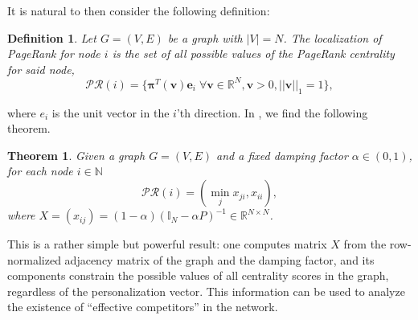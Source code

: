 \documentclass[sn-mathphys-ay]{sn-jnl}%
\newcommand{\R}{\mathbb{R}}
\newcommand{\N}{\mathbb{N}}
\newcommand{\I}{\mathbb{I}}
\theoremstyle{thmstyleone}%
\newtheorem{theorem}{Theorem}%
\theoremstyle{thmstyletwo}%
\theoremstyle{thmstylethree}%
\newtheorem{definition}{Definition}%
\begin{document}
It is natural to then consider the following definition:
\begin{definition}\label{def:localizationPageRank}
	Let $G=(V,E)$ be a graph with $|V|=N$. The localization of PageRank for node $i$ is the set of all possible values of the PageRank centrality for said node,
	\begin{equation}
		\mathcal{PR}(i)=\{\bm{\pi}^T(\bm{v}) \bm{e}_i \; \forall \bm{v}\in\R^N, \bm{v}>0, ||\bm{v}||_1=1 \},
	\end{equation}
\end{definition}

where $e_i$ is the unit vector in the $i$'th direction. In \cite{garcia2012localization}, we find the following theorem.
\begin{theorem}\label{thm:localizationPageRank}
	Given a graph $G=(V,E)$ and a fixed damping factor $\alpha\in (0,1)$, for each node $i\in \N$
	\begin{equation}
		\mathcal{PR}(i) = (\min_j x_{ji} , x_{ii}),
	\end{equation}
	where $X = (x_{ij}) = (1 - \alpha)(\I_N - \alpha P)^{-1} \in \R^{N\times N}$.
\end{theorem}

This is a rather simple but powerful result: one computes matrix $X$ from the row-normalized adjacency matrix of the graph and the damping factor, and its components constrain the possible values of all centrality scores in the graph, regardless of the personalization vector. This information can be used to analyze the existence of ``effective competitors'' in the network.
\end{document}
